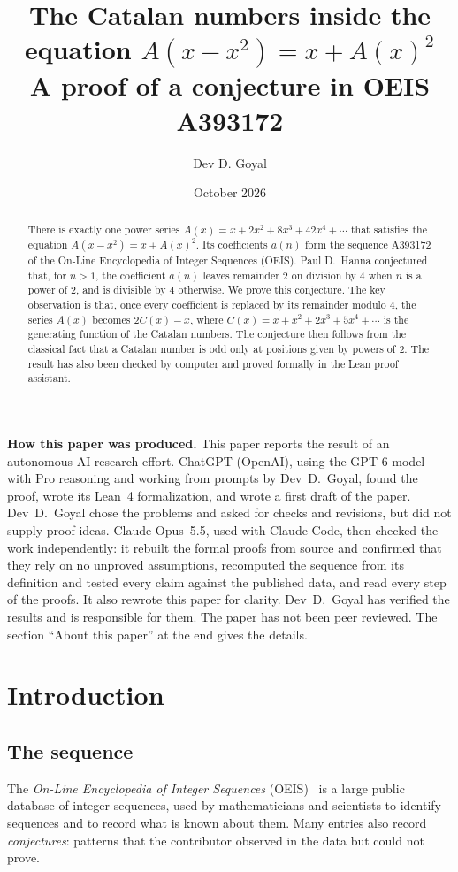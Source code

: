 \documentclass[11pt,a4paper]{article}
\title{The Catalan numbers inside the equation $A(x-x^2)=x+A(x)^2$\\[6pt]\large A proof of a conjecture in OEIS A393172}
\author{Dev D. Goyal}
\date{October 2026}
\theoremstyle{definition}
\theoremstyle{remark}
\begin{document}
\maketitle
\begin{abstract}
There is exactly one power series $A(x)=x+2x^2+8x^3+42x^4+\cdots$ that satisfies the equation $A(x-x^2)=x+A(x)^2$.
Its coefficients $a(n)$ form the sequence A393172 of the On-Line Encyclopedia of Integer Sequences (OEIS).
Paul D.~Hanna conjectured that, for $n>1$, the coefficient $a(n)$ leaves remainder $2$ on division by $4$ when $n$ is a
power of $2$, and is divisible by $4$ otherwise. We prove this conjecture. The key observation is that, once every
coefficient is replaced by its remainder modulo $4$, the series $A(x)$ becomes $2C(x)-x$, where
$C(x)=x+x^2+2x^3+5x^4+\cdots$ is the generating function of the Catalan numbers. The conjecture then follows from the
classical fact that a Catalan number is odd only at positions given by powers of $2$. The result has also been checked
by computer and proved formally in the Lean proof assistant.
\end{abstract}
\begin{center}\begin{minipage}{0.88\linewidth}\small
\textbf{How this paper was produced.} This paper reports the result of an autonomous AI research effort.
ChatGPT (OpenAI), using the GPT-6 model with Pro reasoning and working from prompts by Dev~D.~Goyal, found the proof, wrote its Lean~4 formalization, and wrote a first draft of the paper.
Dev~D.~Goyal chose the problems and asked for checks and revisions, but did not supply proof ideas.
Claude Opus~5.5, used with Claude Code, then checked the work independently: it rebuilt the formal proofs from
source and confirmed that they rely on no unproved assumptions, recomputed the sequence from its definition and tested
every claim against the published data, and read every step of the proofs. It also rewrote this paper for clarity.
Dev~D.~Goyal has verified the results and is responsible for them. The paper has not been peer reviewed.
The section ``About this paper'' at the end gives the details.
\end{minipage}\end{center}

\section{Introduction}

\subsection{The sequence}\label{sec:sequence}
The \emph{On-Line Encyclopedia of Integer Sequences} (OEIS)~\cite{oeisdb} is a large public database of integer
sequences, used by mathematicians and scientists to identify sequences and to record what is known about them. Many
entries also record \emph{conjectures}: patterns that the contributor observed in the data but could not prove.
\end{document}
